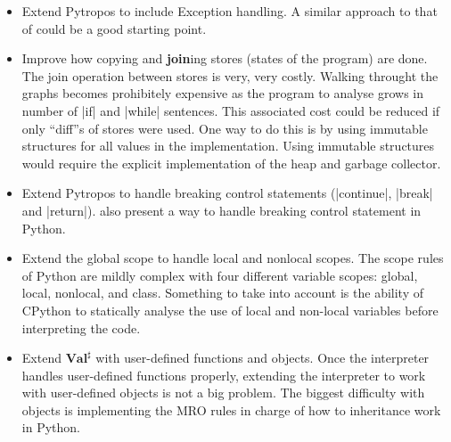 \begin{itemize}
\tightlist
\item Extend Pytropos to include Exception handling. A similar approach to that of
  \textcite{fromherz_static_2018} could be a good starting point.
\item Improve how copying and \textbf{join}ing stores (states of the program) are done.
  The join operation between stores is very, very costly. Walking throught the graphs
  becomes prohibitely expensive as the program to analyse grows in number of \pycode|if|
  and \pycode|while| sentences. This associated cost could be reduced if only
  \enquote{diff}s of stores were used. One way to do this is by using immutable
  structures for all values in the implementation. Using immutable structures would
  require the explicit implementation of the heap and garbage collector.
\item Extend Pytropos to handle breaking control statements (\pycode|continue|,
  \pycode|break| and \pycode|return|). \textcite{fromherz_static_2018} also present a way
  to handle breaking control statement in Python.
\item Extend the global scope to handle local and nonlocal scopes. The scope rules of
  Python are mildly complex with four different variable scopes: global, local, nonlocal,
  and class. Something to take into account is the ability of CPython to statically
  analyse the use of local and non-local variables before interpreting the code.
\item Extend \(\mathbf{Val}^\sharp\) with user-defined functions and objects. Once the
  interpreter handles user-defined functions properly, extending the interpreter to work
  with user-defined objects is not a big problem. The biggest difficulty with
  objects is implementing the MRO rules in charge of how to inheritance work in Python.
\end{itemize}


